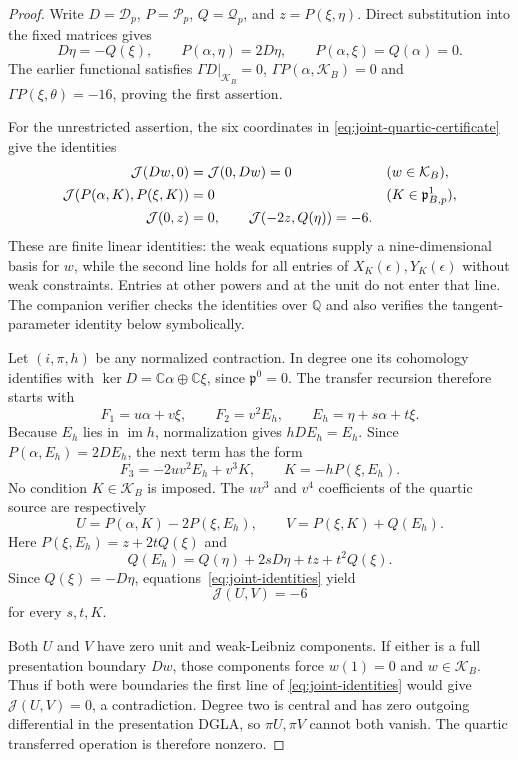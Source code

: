 \documentclass[11pt]{amsart}
\newcommand{\cD}{\mathscr D}
\newcommand{\cQ}{\mathscr Q}
\newcommand{\cP}{\mathscr P}
\newcommand{\C}{\mathbb C}
\newcommand{\Q}{\mathbb Q}
\newcommand{\gpres}{\mathfrak p}
\begin{document}
\begin{proof}
Write $D=\cD_p$, $P=\cP_p$, $Q=\cQ_p$, and $z=P(\xi,\eta)$.
Direct substitution into the fixed matrices gives
\[
D\eta=-Q(\xi),\qquad P(\alpha,\eta)=2D\eta,\qquad
P(\alpha,\xi)=Q(\alpha)=0.
\]
The earlier functional satisfies $\Gamma D|_{\mathcal K_B}=0$,
$\Gamma P(\alpha,\mathcal K_B)=0$ and $\Gamma P(\xi,\theta)=-16$,
proving the first assertion.

For the unrestricted assertion, the six coordinates in
\eqref{eq:joint-quartic-certificate} give the identities
\begin{align}
\mathcal J(Dw,0)&=\mathcal J(0,Dw)=0
&& (w\in\mathcal K_B),\notag\\
\mathcal J(P(\alpha,K),P(\xi,K))&=0
&& (K\in\gpres^1_{B,p}),\label{eq:joint-identities}\\
\mathcal J(0,z)&=0,\qquad
\mathcal J(-2z,Q(\eta))=-6.\notag
\end{align}
These are finite linear identities: the weak equations supply a
nine-dimensional basis for $w$, while the second line holds for all entries
of $X_K(\epsilon),Y_K(\epsilon)$ without weak constraints. Entries at other
powers and at the unit do not enter that line. The companion verifier
checks the identities over $\Q$ and also verifies the tangent-parameter
identity below symbolically.

Let $(i,\pi,h)$ be any normalized contraction. In degree one its cohomology
identifies with $\ker D=\C\alpha\oplus\C\xi$, since $\gpres^0=0$.
The transfer recursion therefore starts with
\[
F_1=u\alpha+v\xi,\qquad
F_2=v^2E_h,\qquad E_h=\eta+s\alpha+t\xi.
\]
Because $E_h$ lies in $\operatorname{im}h$, normalization gives
$hDE_h=E_h$. Since $P(\alpha,E_h)=2DE_h$, the next term has the form
\[
F_3=-2uv^2E_h+v^3K,\qquad K=-hP(\xi,E_h).
\]
No condition $K\in\mathcal K_B$ is imposed. The $uv^3$ and $v^4$
coefficients of the quartic source are respectively
\[
U=P(\alpha,K)-2P(\xi,E_h),\qquad
V=P(\xi,K)+Q(E_h).
\]
Here $P(\xi,E_h)=z+2tQ(\xi)$ and
\[
Q(E_h)=Q(\eta)+2sD\eta+tz+t^2Q(\xi).
\]
Since $Q(\xi)=-D\eta$, equations~\eqref{eq:joint-identities} yield
\[
\boxed{\mathcal J(U,V)=-6}
\]
for every $s,t,K$.

Both $U$ and $V$ have zero unit and weak-Leibniz components. If either is
a full presentation boundary $Dw$, those components force
$w(1)=0$ and $w\in\mathcal K_B$. Thus if both were boundaries the first
line of \eqref{eq:joint-identities} would give $\mathcal J(U,V)=0$,
a contradiction. Degree two is central and has zero outgoing
differential in the presentation DGLA, so $\pi U,\pi V$ cannot both
vanish. The quartic transferred operation is therefore nonzero.
\end{proof}
\end{document}
